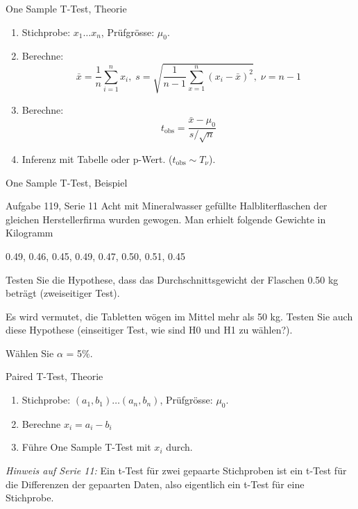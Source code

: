 \documentclass[handout]{beamer}
\begin{document}
\begin{frame}{One Sample T-Test, Theorie}
\begin{enumerate}
\item Stichprobe: $x_1\ldots x_n$, Prüfgrösse: $\mu_0$.
\item Berechne:
$$
\bar{x}=\frac{1}{n}\sum_{i=1}^n x_i,\;
s=\sqrt{\frac{1}{n-1}\sum_{x=1}^{n}(x_i-\bar{x})^2},\;
\nu=n-1
$$
\item Berechne:
$$
t_\text{obs}=\frac{\bar{x}-\mu_0}{s/\sqrt{n}}
$$
\item Inferenz mit Tabelle oder p-Wert. ($t_\text{obs}\sim T_\nu$).
\end{enumerate}
\end{frame}

\begin{frame}{One Sample T-Test, Beispiel}
\begin{beamerboxesrounded}[shadow]{Aufgabe 119, Serie 11}
Acht mit Mineralwasser gefüllte Halbliterflaschen der gleichen Herstellerfirma
wurden gewogen. Man erhielt folgende Gewichte in Kilogramm

\begin{center}
0.49, 0.46, 0.45, 0.49, 0.47, 0.50, 0.51, 0.45
\end{center}
\begin{outline}
\item Testen Sie die Hypothese, dass das Durchschnittsgewicht der Flaschen 0.50
kg beträgt (zweiseitiger Test).
\item Es wird vermutet, die Tabletten wögen im Mittel mehr als 50 kg. Testen Sie auch diese
Hypothese (einseitiger Test, wie sind H0 und H1 zu wählen?).
\end{outline}
Wählen Sie $\alpha$ = 5\%.
\end{beamerboxesrounded}
\end{frame}

\begin{frame}{Paired T-Test, Theorie}
\begin{enumerate}
\item Stichprobe: $(a_1, b_1)\ldots (a_n,b_n)$, Prüfgrösse: $\mu_0$.
\item Berechne $x_i=a_i-b_i$
\item Führe One Sample  T-Test mit $x_i$ durch.
\end{enumerate}
\vfill
\textit{Hinweis auf Serie 11:} Ein t-Test für zwei gepaarte Stichproben ist ein
t-Test für die Differenzen der gepaarten Daten, also eigentlich ein t-Test für
eine Stichprobe.
\end{frame}
\end{document}
